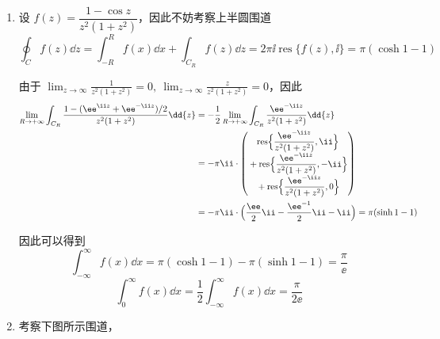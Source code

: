 \begin{question}
\begin{solution}
\begin{enumerate}
综上可以得到
\[
\operatorname{v.p.}\int_{-\infty}^{\infty}f(x)\dd{x}=-\frac{\pi\sin(2a)}{2a}
\]
\[
\int_{-\infty}^{\infty}\frac{\cos(x+a)\sin(x-a)}{x^2-a^2}\dd{x}=\Im\Bigl\{\int_{-\infty}^{\infty}f(x)\dd{x}\Bigr\}=0
\]

  \item 设 \(f(z)=\dfrac{1-\cos z}{z^2(1+z^2)}\)，因此不妨考察上半圆围道
\[
\oint_C f(z)\dd{z}=\int_{-R}^{R}f(x)\dd{x}+\int_{C_R}f(z)\dd{z}=2\pi\ii\operatorname{res}\{f(z),\ii\}=\pi(\cosh1-1)
\]

由于 \(\displaystyle\lim_{z\to\infty}\frac{1}{z^2(1+z^2)}=0,\ \lim_{z\to\infty}\frac{z}{z^2(1+z^2)}=0\)，因此
\[
\begin{aligned}
\lim_{R\to+\infty}\int_{C_R}\frac{1-(\ee^{\ii z}+\ee^{-\ii z})/2}{z^2(1+z^2)}\dd{z}
&=-\frac12\lim_{R\to+\infty}\int_{C_R}\frac{\ee^{-\ii z}}{z^2(1+z^2)}\dd{z}\\
&=-\pi\ii\cdot\begin{pmatrix}
\operatorname{res}\Bigl\{\dfrac{\ee^{-\ii z}}{z^2(1+z^2)},\ii\Bigr\}\\{}+\operatorname{res}\Bigl\{\dfrac{\ee^{-\ii z}}{z^2(1+z^2)},-\ii\Bigr\}\\{}+\operatorname{res}\Bigl\{\dfrac{\ee^{-\ii z}}{z^2(1+z^2)},0\Bigr\}
\end{pmatrix}\\
&=-\pi\ii\cdot\Bigl(\frac{\ee}{2}\ii-\frac{\ee^{-1}}{2}\ii-\ii\Bigr)=\pi(\sinh1-1)
\end{aligned}
\]

因此可以得到
\[
\int_{-\infty}^{\infty}f(x)\dd{x}=\pi(\cosh1-1)-\pi(\sinh1-1)=\frac{\pi}{\ee}
\]
\[
\int_{0}^{\infty}f(x)\dd{x}=\frac12\int_{-\infty}^{\infty}f(x)\dd{x}=\frac{\pi}{2\ee}
\]

  \item 考察下图所示围道，

\begin{center}
\end{center}


\end{enumerate}
\end{solution}
\end{question}
